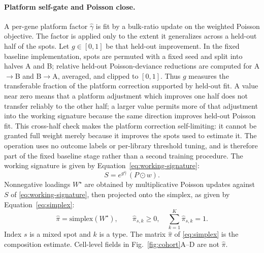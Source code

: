 \paragraph{Platform self-gate and Poisson close.}
A per-gene platform factor \(\hat\gamma\) is fit by a bulk-ratio update on the weighted Poisson objective. The factor is applied only to the extent it generalizes across a held-out half of the spots. Let \(g\in[0,1]\) be that held-out improvement. In the fixed baseline implementation, spots are permuted with a fixed seed and split into halves A and B; relative held-out Poisson-deviance reductions are computed for A\(\to\)B and B\(\to\)A, averaged, and clipped to \([0,1]\). Thus \(g\) measures the transferable fraction of the platform correction supported by held-out fit. A value near zero means that a platform adjustment which improves one half does not transfer reliably to the other half; a larger value permits more of that adjustment into the working signature because the same direction improves held-out Poisson fit. This cross-half check makes the platform correction self-limiting: it cannot be granted full weight merely because it improves the spots used to estimate it. The operation uses no outcome labels or per-library threshold tuning, and is therefore part of the fixed baseline stage rather than a second training procedure. The working signature is given by Equation~\eqref{eq:working-signature}:
\begin{equation}
S=e^{g\hat\gamma}\,(P\odot w).
\label{eq:working-signature}
\end{equation}
Nonnegative loadings \(W^\star\) are obtained by multiplicative Poisson updates against \(S\) of \eqref{eq:working-signature}, then projected onto the simplex, as given by Equation~\eqref{eq:simplex}:
\begin{equation}
\hat\pi=\mathrm{simplex}(W^\star),\qquad \hat\pi_{s,k}\ge 0,\quad \sum_{k=1}^{K}\hat\pi_{s,k}=1.
\label{eq:simplex}
\end{equation}
Index \(s\) is a mixed spot and \(k\) is a type. The matrix \(\hat\pi\) of \eqref{eq:simplex} is the composition estimate. Cell-level fields in Fig.~\ref{fig:cohort}A--D are not \(\hat\pi\).

